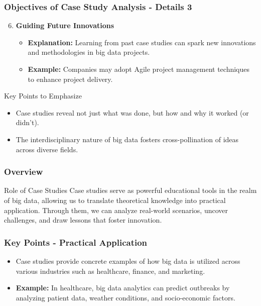 \documentclass[aspectratio=169]{beamer}
\begin{document}
\begin{frame}[fragile]
    \frametitle{Objectives of Case Study Analysis - Details 3}
    \begin{enumerate}
        \setcounter{enumi}{5} %
        \item \textbf{Guiding Future Innovations}  
            \begin{itemize}
                \item \textbf{Explanation:} Learning from past case studies can spark new innovations and methodologies in big data projects.
                \item \textbf{Example:} Companies may adopt Agile project management techniques to enhance project delivery.
            \end{itemize}
    \end{enumerate}

    \begin{block}{Key Points to Emphasize}
        \begin{itemize}
            \item Case studies reveal not just what was done, but how and why it worked (or didn’t).
            \item The interdisciplinary nature of big data fosters cross-pollination of ideas across diverse fields.
        \end{itemize}
    \end{block}
\end{frame}

\begin{frame}[fragile]
    \frametitle{Overview}
    \begin{block}{Role of Case Studies}
        Case studies serve as powerful educational tools in the realm of big data, allowing us to translate theoretical knowledge into practical application. Through them, we can analyze real-world scenarios, uncover challenges, and draw lessons that foster innovation.
    \end{block}
\end{frame}

\begin{frame}[fragile]
    \frametitle{Key Points - Practical Application}
    \begin{itemize}
        \item Case studies provide concrete examples of how big data is utilized across various industries such as healthcare, finance, and marketing.
        \item \textbf{Example:} In healthcare, big data analytics can predict outbreaks by analyzing patient data, weather conditions, and socio-economic factors.
    \end{itemize}
\end{frame}
\end{document}
